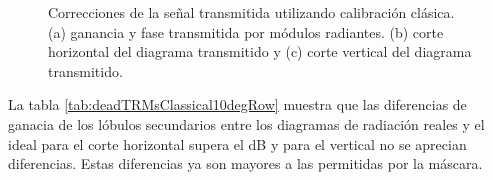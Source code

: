 \begin{figure}[H]
	\centering

	\caption{Correcciones de la señal transmitida utilizando calibración clásica. (a) ganancia y fase transmitida por módulos
		radiantes. (b) corte horizontal del diagrama transmitido y (c) corte vertical del diagrama transmitido.}
	\label{fig:deadTRMsClassical10degRow}
\end{figure}

La tabla \ref{tab:deadTRMsClassical10degRow} muestra que las diferencias de ganacia de los lóbulos secundarios entre los 
diagramas de radiación reales y el ideal para el corte horizontal supera el dB y para el vertical no se aprecian diferencias. 
Estas diferencias ya son mayores a las permitidas por la máscara.

